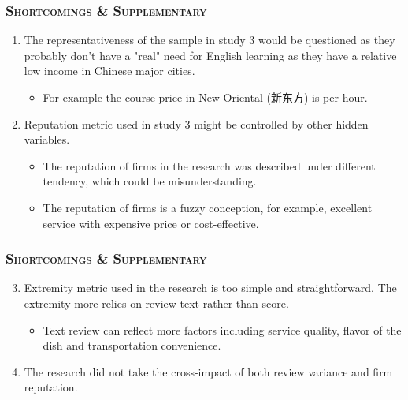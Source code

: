 \documentclass{../presentation}
\begin{document}
    \begin{frame}
        \frametitle{\textsc{Shortcomings \& Supplementary}}

        \small

        \begin{enumerate}
            \item The representativeness of the sample in study 3 would be questioned as they probably don't have a "real" need for English learning as they have a relative low income in Chinese major cities.
            \begin{itemize}
                \item For example the course price in New Oriental (新东方) is  per hour.
            \end{itemize}
            \item Reputation metric used in study 3 might be controlled by other hidden variables.
            \begin{itemize}
                \item The reputation of firms in the research was described under different tendency, which could be misunderstanding.
                \item The reputation of firms is a fuzzy conception, for example, excellent service with expensive price or cost-effective.
            \end{itemize}
        \end{enumerate}

    \end{frame}

    \begin{frame}
        \frametitle{\textsc{Shortcomings \& Supplementary}}

        \begin{enumerate}
            \setcounter{enumi}{2}
            \item Extremity metric used in the research is too simple and straightforward. The extremity more relies on review text rather than score.
            \begin{itemize}
                \item Text review can reflect more factors including service quality, flavor of the dish and transportation convenience.
            \end{itemize}
            \item The research did not take the cross-impact of both review variance and firm reputation.
        \end{enumerate}

    \end{frame}
\end{document}
